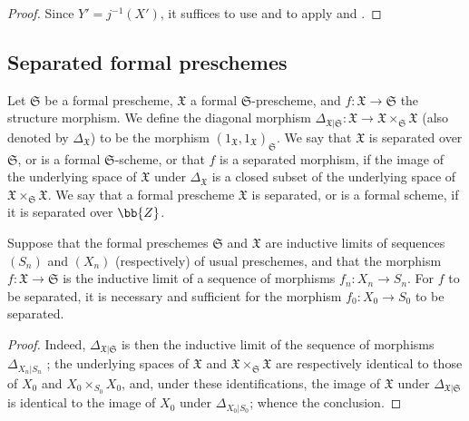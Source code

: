 \begin{proof}
Since $Y'=j^{-1}(X')$, it suffices to use  and to apply  and .
\end{proof}

\subsection{Separated formal preschemes}
\label{subsection:I.10.15}

\begin{definition}[10.15.1]
\label{I.10.15.1}
Let $\mathfrak{S}$ be a formal prescheme, $\mathfrak{X}$ a formal $\mathfrak{S}$-prescheme, and $f:\mathfrak{X}\to\mathfrak{S}$ the structure morphism.
We define the diagonal morphism $\Delta_{\mathfrak{X}|\mathfrak{S}}:\mathfrak{X}\to\mathfrak{X}\times_\mathfrak{S}\mathfrak{X}$ (also denoted by $\Delta_\mathfrak{X}$) to be the morphism $(1_\mathfrak{X},1_\mathfrak{X})_\mathfrak{S}$.
We say that $\mathfrak{X}$ is separated over $\mathfrak{S}$, or is a formal $\mathfrak{S}$-scheme, or that $f$ is a separated morphism, if the image of the underlying space of $\mathfrak{X}$ under $\Delta_\mathfrak{X}$ is a closed subset of the underlying space of $\mathfrak{X}\times_\mathfrak{S}\mathfrak{X}$.
We say that a formal prescheme $\mathfrak{X}$ is separated, or is a formal scheme, if it is separated over $\bb{Z}$.
\end{definition}

\begin{proposition}[10.15.2]
\label{I.10.15.2}
Suppose that the formal preschemes $\mathfrak{S}$ and $\mathfrak{X}$ are inductive limits of sequences $(S_n)$ and $(X_n)$ (respectively) of usual preschemes, and that the morphism $f:\mathfrak{X}\to\mathfrak{S}$ is the inductive limit of a sequence of morphisms $f_n:X_n\to S_n$.
For $f$ to be separated, it is necessary and sufficient for the morphism $f_0:X_0\to S_0$ to be separated.
\end{proposition}

\begin{proof}
Indeed, $\Delta_{\mathfrak{X}|\mathfrak{S}}$ is then the inductive limit of the sequence of morphisms $\Delta_{X_n|S_n}$ ; the underlying spaces of $\mathfrak{X}$ and $\mathfrak{X}\times_\mathfrak{S}\mathfrak{X}$ are respectively identical to those of $X_0$ and $X_0\times_{S_0}X_0$, and, under these identifications, the image of $\mathfrak{X}$ under $\Delta_{\mathfrak{X}|\mathfrak{S}}$ is identical to the image of $X_0$ under $\Delta_{X_0|S_0}$;
whence the conclusion.
\end{proof}

